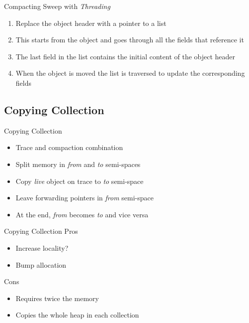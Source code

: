 \documentclass[
14pt,
aspectratio=169,
usenames,
dvipsnames,
x11names]{beamer}
\newcommand{\tik}[0]{{\color{green}\Checkmark}} %
\newcommand{\ex}[0]{{\color{red}\XSolidBrush}}  %
\begin{document}
\begin{frame}{Compacting Sweep with \textit{Threading}}
  \begin{enumerate}  \setlength{\itemsep}{\fill}
  \item Replace the object header with a pointer to a list
  \item This starts from the object and goes through all the fields that reference it
  \item The last field in the list contains the initial content of the object header
  \item When the object is moved the list is traversed to update the corresponding fields
  \end{enumerate}
\end{frame}

\subsection{Copying Collection}

\begin{frame}{Copying Collection}
  \begin{itemize}  \setlength{\itemsep}{\fill}
  \item \alert{Trace and compaction} combination
  \item \alert{Split memory} in \textit{from} and \textit{to} semi-spaces
  \item \alert{Copy} \textit{live} object on trace to \textit{to} semi-space
  \item \alert{Leave} forwarding pointers in \textit{from} semi-space
  \item At the end, \textit{from} becomes \textit{to} and vice versa
  \end{itemize}
\end{frame}

\begin{frame}{Copying Collection}
  Pros \tik
  \begin{itemize}  \setlength{\itemsep}{\fill}
  \item \alert{Increase locality?}
  \item \alert{Bump} allocation
  \end{itemize}

  \pause

  Cons \ex
  \begin{itemize}  \setlength{\itemsep}{\fill}
  \item Requires \alert{twice the memory}
  \item \alert{Copies the whole heap} in each collection
  \end{itemize}
\end{frame}
\end{document}
